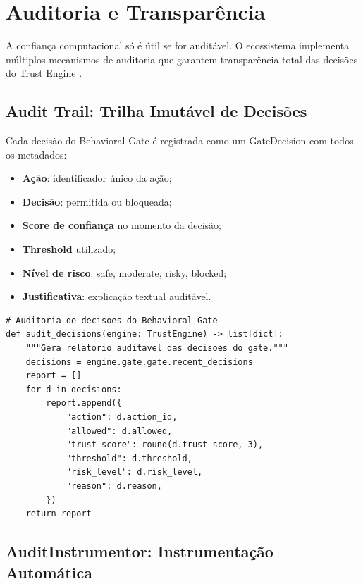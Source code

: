 \section{Auditoria e Transparência}
\label{sec:auditoria}
\nivelintermediario

A confiança computacional só é útil se for auditável. O ecossistema
implementa múltiplos mecanismos de auditoria que garantem
transparência total das decisões do Trust Engine \cite{opencode2026spec038,
opencode2026ecosystem}.

\subsection{Audit Trail: Trilha Imutável de Decisões}

Cada decisão do Behavioral Gate é registrada como um GateDecision com
todos os metadados:

\begin{itemize}
\item \textbf{Ação}: identificador único da ação;
\item \textbf{Decisão}: permitida ou bloqueada;
\item \textbf{Score de confiança} no momento da decisão;
\item \textbf{Threshold} utilizado;
\item \textbf{Nível de risco}: safe, moderate, risky, blocked;
\item \textbf{Justificativa}: explicação textual auditável.
\end{itemize}

\begin{lstlisting}[style=pythonstyle]
# Auditoria de decisoes do Behavioral Gate
def audit_decisions(engine: TrustEngine) -> list[dict]:
    """Gera relatorio auditavel das decisoes do gate."""
    decisions = engine.gate.gate.recent_decisions
    report = []
    for d in decisions:
        report.append({
            "action": d.action_id,
            "allowed": d.allowed,
            "trust_score": round(d.trust_score, 3),
            "threshold": d.threshold,
            "risk_level": d.risk_level,
            "reason": d.reason,
        })
    return report
\end{lstlisting}

\subsection{AuditInstrumentor: Instrumentação Automática}

